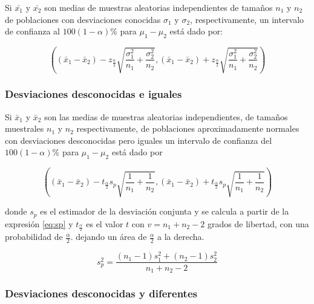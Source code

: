 \documentclass[]{book}
\begin{document}
Si \(\bar{x_1}\) y \(\bar{x_2}\) son medias de muestras aleatorias
independientes de tamaños \(n_1\) y \(n_2\) de poblaciones con
desviaciones conocidas \(\sigma_1\) y \(\sigma_2\), respectivamente, un
intervalo de confianza al \(100\left(1-\alpha\right)\%\) para
\(\mu_1-\mu_2\) está dado por:

\begin{equation} 
\left( \left( \bar{x}_1 - \bar{x}_2 \right) - z_{\frac{\alpha}{2}}\sqrt{\dfrac{\sigma_1^2}{n_1} + \dfrac{\sigma_2^2}{n_2}} , \left( \bar{x}_1 - \bar{x}_2 \right) + z_{\frac{\alpha}{2}}\sqrt{\dfrac{\sigma_1^2}{n_1} + \dfrac{\sigma_2^2}{n_2}} \right) 
\label{eq:ic2msc}
\end{equation}

\subsubsection{Desviaciones desconocidas e
iguales}\label{desviaciones-desconocidas-e-iguales}

Si \(\bar{x}_1\) y \(\bar{x}_2\) son las medias de muestras aleatorias
independientes, de tamaños muestrales \(n_1\) y \(n_2\) respectivamente,
de poblaciones aproximadamente normales con desviaciones desconocidas
pero iguales un intervalo de confianza del
\(100\left(1-\alpha \right)\%\) para \(\mu_1 - \mu_2\) está dado por

\begin{equation} 
\left( \left( \bar{x}_1 - \bar{x}_2 \right) - t_{\frac{\alpha}{2}}s_p\sqrt{\dfrac{1}{n_1} + \dfrac{1}{n_2}} , \left( \bar{x}_1 - \bar{x}_2 \right) + t_{\frac{\alpha}{2}}s_p\sqrt{\dfrac{1}{n_1} + \dfrac{1}{n_2}} \right) 
\label{eq:ic2msd}
\end{equation}

donde \(s_p\) es el estimador de la desviación conjunta y se calcula a
partir de la expresión \eqref{eq:sp} y \(t_{\frac{\alpha}{2}}\) es el
valor \(t\) con \(v=n_1+n_2-2\) grados de libertad, con una probabilidad
de \(\frac{\alpha}{2}\). dejando un área de \(\frac{\alpha}{2}\) a la
derecha.

\begin{equation} 
s_p^2 = \dfrac{\left(n_1 - 1 \right)s_1^2+\left(n_2 - 1 \right)s_2^2}{n_1 +n_2 -2} 
\label{eq:sp}
\end{equation}

\subsubsection{Desviaciones desconocidas y
diferentes}\label{desviaciones-desconocidas-y-diferentes}
\end{document}
